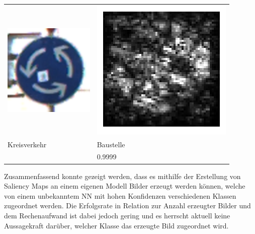 \begin{tabular}{p{4.4cm}p{4.4cm}}
	\includegraphics[height=4.4cm]{Images/AnPe/04709} &\includegraphics[width=\linewidth]{Images/AnPe/04709_int_grad}  \\
	Kreisverkehr &Baustelle \\
	& 0.9999
	
	
\end{tabular}


Zusammenfassend konnte gezeigt werden, dass es mithilfe der Erstellung von Saliency Maps an einem eigenen Modell Bilder erzeugt werden können, welche von einem unbekanntem NN mit hohen Konfidenzen verschiedenen Klassen zugeordnet werden. Die Erfolgsrate in Relation zur Anzahl erzeugter Bilder und dem Rechenaufwand ist dabei jedoch gering und es herrscht aktuell keine Aussagekraft darüber, welcher Klasse das erzeugte Bild zugeordnet wird. 
